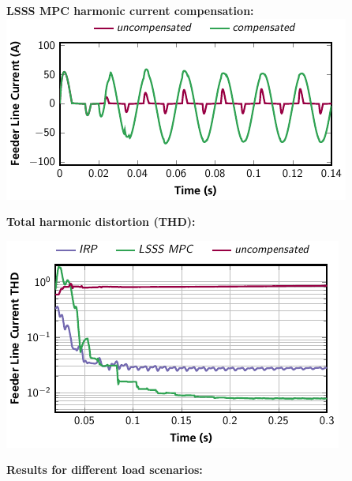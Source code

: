 \documentclass[a0paper,portrait]{baposter}
\begin{document}
\begin{poster}
{\textbf{LSSS MPC harmonic current compensation:}
\includegraphics{mpcif}

\vspace{-.4em}
\begin{flushleft}
\textbf{Total harmonic distortion (THD):}
\end{flushleft}
\vspace{-.6em}
\includegraphics{thd} \\

\vspace{-1.7em}
\begin{flushleft}
\textbf{Results for different load scenarios:} \end{flushleft}

}
\end{poster}
\end{document}
